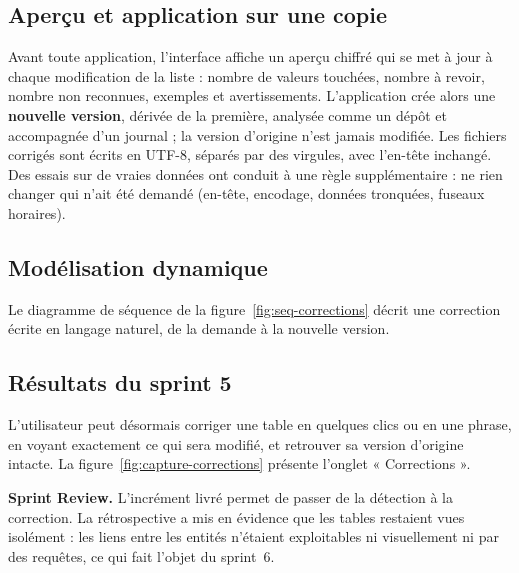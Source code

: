 \subsection{Aperçu et application sur une copie}

Avant toute application, l'interface affiche un aperçu chiffré qui se met à jour à chaque modification de la liste : nombre de valeurs touchées, nombre à revoir, nombre non reconnues, exemples et avertissements. L'application crée alors une \textbf{nouvelle version}, dérivée de la première, analysée comme un dépôt et accompagnée d'un journal ; la version d'origine n'est jamais modifiée. Les fichiers corrigés sont écrits en UTF-8, séparés par des virgules, avec l'en-tête inchangé. Des essais sur de vraies données ont conduit à une règle supplémentaire : ne rien changer qui n'ait été demandé (en-tête, encodage, données tronquées, fuseaux horaires).

\subsection{Modélisation dynamique}

Le diagramme de séquence de la figure~\ref{fig:seq-corrections} décrit une correction écrite en langage naturel, de la demande à la nouvelle version.


\subsection{Résultats du sprint 5}

L'utilisateur peut désormais corriger une table en quelques clics ou en une phrase, en voyant exactement ce qui sera modifié, et retrouver sa version d'origine intacte. La figure~\ref{fig:capture-corrections} présente l'onglet « Corrections ».


\noindent\textbf{Sprint Review.} L'incrément livré permet de passer de la détection à la correction. La rétrospective a mis en évidence que les tables restaient vues isolément : les liens entre les entités n'étaient exploitables ni visuellement ni par des requêtes, ce qui fait l'objet du sprint~6.

